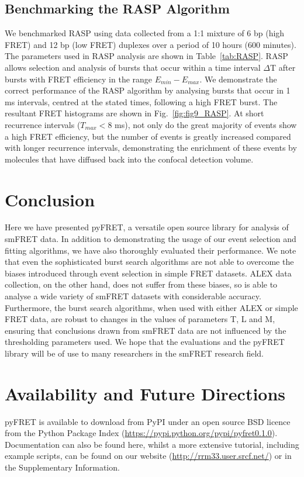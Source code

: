 \documentclass[10pt]{article}
\begin{document}
\subsection*{Benchmarking the RASP Algorithm}    
We benchmarked RASP using data collected from a 1:1 mixture of 6 bp (high FRET) and 12 bp (low FRET) duplexes over a period of 10 hours (600 minutes). The parameters used in RASP analysis are shown in Table~\ref{tab:RASP}. RASP allows selection and analysis of bursts that occur within a time interval $\Delta$T after bursts with FRET efficiency in the range $E_{min} - E_{max}$. We demonstrate the correct performance of the RASP algorithm by analysing bursts that occur in 1 ms intervals, centred at the stated times, following a high FRET burst. The resultant FRET histograms are shown in Fig.~\ref{fig:fig9_RASP}. At short recurrence intervals ($T_{max} < 8$ ms), not only do the great majority of events show a high FRET efficiency, but the number of events is greatly increased compared with longer recurrence intervals, demonstrating the enrichment of these events by molecules that have diffused back into the confocal detection volume. 

\section*{Conclusion}
Here we have presented pyFRET, a versatile open source library for analysis of smFRET data. In addition to demonstrating the usage of our event selection and fitting algorithms, we have also thoroughly evaluated their performance. We note that even the sophisticated burst search algorithms are not able to overcome the biases introduced through event selection in simple FRET datasets. ALEX data collection, on the other hand, does not suffer from these biases, so is able to analyse a wide variety of smFRET datasets with considerable accuracy. Furthermore, the burst search algorithms, when used with either ALEX or simple FRET data, are robust to changes in the values of parameters T, L and M, ensuring that conclusions drawn from smFRET data are not influenced by the thresholding parameters used. We hope that the evaluations and the pyFRET library will be of use to many researchers in the smFRET research field. 
 
\section*{Availability and Future Directions}
pyFRET is available to download from PyPI under an open source BSD licence from the Python Package Index (\url{https://pypi.python.org/pypi/pyfret0.1.0}). Documentation can also be found here, whilst a more extensive tutorial, including example scripts, can be found on our website (\url{http://rrm33.user.srcf.net/}) or in the Supplementary Information.
\end{document}
